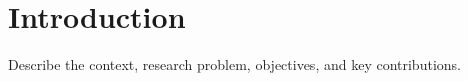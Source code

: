 ﻿\section{Introduction}

Describe the context, research problem, objectives, and key contributions.
